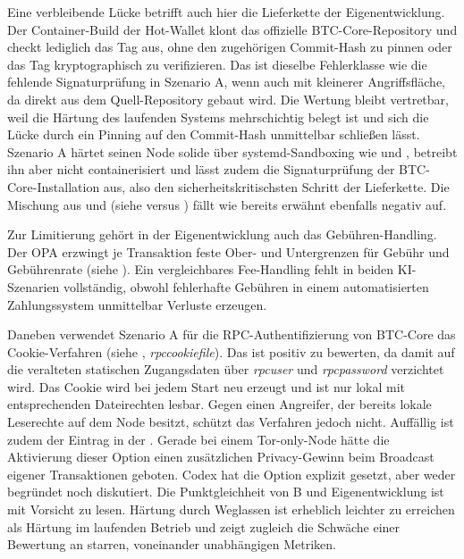 {Eine verbleibende Lücke betrifft auch hier die Lieferkette der Eigenentwicklung. Der Container-Build der Hot-Wallet klont das offizielle \ac{BTC}-Core-Repository und checkt lediglich das Tag  aus, ohne den zugehörigen Commit-Hash zu pinnen oder das Tag kryptographisch zu verifizieren. Das ist dieselbe Fehlerklasse wie die fehlende Signaturprüfung in Szenario A, wenn auch mit kleinerer Angriffsfläche, da direkt aus dem Quell-Repository gebaut wird. 
Die Wertung bleibt vertretbar, weil die Härtung des laufenden Systems mehrschichtig belegt ist und sich die Lücke durch ein Pinning auf den Commit-Hash unmittelbar schließen lässt.
Szenario A härtet seinen Node solide über systemd-Sandboxing wie  und , betreibt ihn aber nicht containerisiert und lässt zudem die Signaturprüfung der \ac{BTC}-Core-Installation aus, also den sicherheitskritischsten Schritt der Lieferkette. Die Mischung aus  und  (siehe  versus ) fällt wie bereits erwähnt ebenfalls negativ auf.

Zur Limitierung gehört in der Eigenentwicklung auch das Gebühren-Handling. Der \ac{OPA} erzwingt je Transaktion feste Ober- und Untergrenzen für Gebühr und Gebührenrate (siehe ).
Ein vergleichbares Fee-Handling fehlt in beiden \ac{KI}-Szenarien vollständig, obwohl fehlerhafte Gebühren in einem automatisierten Zahlungssystem unmittelbar Verluste erzeugen.

Daneben verwendet Szenario A für die \ac{RPC}-Authentifizierung von \ac{BTC}-Core das Cookie-Verfahren (siehe , \emph{rpccookiefile}). Das ist positiv zu bewerten, da damit auf die veralteten statischen Zugangsdaten über \emph{rpcuser} und \emph{rpcpassword} verzichtet wird. Das Cookie wird bei jedem Start neu erzeugt und ist nur lokal mit entsprechenden
Dateirechten lesbar. Gegen einen Angreifer, der bereits lokale Leserechte auf dem Node besitzt, schützt das Verfahren jedoch nicht.
Auffällig ist zudem der Eintrag  in der . Gerade bei einem Tor-only-Node hätte die Aktivierung dieser Option einen zusätzlichen Privacy-Gewinn beim Broadcast eigener Transaktionen geboten. Codex hat die Option explizit gesetzt, aber weder begründet noch diskutiert.
Die Punktgleichheit von B und Eigenentwicklung ist mit Vorsicht zu lesen. Härtung durch Weglassen ist erheblich leichter zu erreichen als Härtung im laufenden Betrieb und zeigt zugleich die Schwäche einer Bewertung an starren, voneinander unabhängigen Metriken.

}
